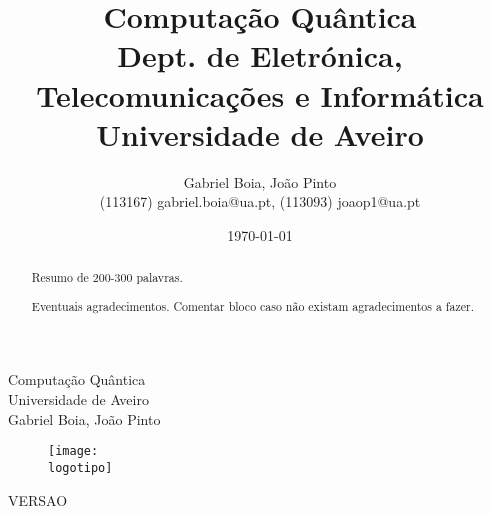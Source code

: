 \documentclass{report}
\begin{document}
%
\def\titulo{Computação Quântica}
\def\data{19/11/22}
\def\autores{Gabriel Boia, João Pinto}
\def\autorescontactos{(113167) gabriel.boia@ua.pt, (113093) joaop1@ua.pt}
\def\versao{VERSAO}
\def\departamento{Dept. de Eletrónica, Telecomunicações e Informática}
\def\empresa{Universidade de Aveiro}
\def\logotipo{ua.pdf}
%
%
\begin{titlepage}

\begin{center}
%
\vspace*{50mm}
%
{\Huge \titulo}\\ 
%
\vspace{10mm}
%
{\Large \empresa}\\
%
\vspace{10mm}
%
{\LARGE \autores}\\ 
%
\vspace{30mm}
%
\begin{figure}[h]
\center
\texttt{[image: \\logotipo]}
\end{figure}
%
\vspace{30mm}
\end{center}
%
\begin{flushright}
\versao
\end{flushright}
\end{titlepage}

\title{%
{\Huge\textbf{\titulo}}\\
{\Large \departamento\\ \empresa}
}
%
\author{%
    \autores \\
    \autorescontactos
}
%
\date{\today}
%
\maketitle


\begin{abstract}
Resumo de 200-300 palavras.
\end{abstract}

\renewcommand{\abstractname}{Agradecimentos}
\begin{abstract}
Eventuais agradecimentos.
Comentar bloco caso não existam agradecimentos a fazer.
\end{abstract}


\tableofcontents
\end{document}
